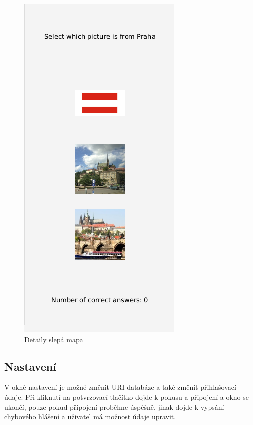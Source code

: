 \documentclass[12pt,a4paper,titlepage]{article}
\begin{document}
\begin{figure}[!htbp]
	\centering
	\includegraphics[scale=0.4]{blind_map}
	\caption{Detaily slepá mapa}
	\label{blindMap}
\end{figure}

\subsection{Nastavení}
V okně nastavení je možné změnit URI databáze a také změnit přihlašovací údaje. Při kliknutí na potvrzovací tlačítko dojde k pokusu a připojení a okno se ukončí, pouze pokud připojení proběhne úspěšně, jinak dojde k vypsání chybového hlášení a uživatel má možnost údaje upravit.
\end{document}
